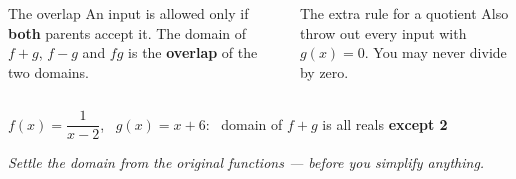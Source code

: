 \documentclass[aspectratio=169, 11pt]{beamer}
\begin{document}
\begin{frame}[t, plain]

  \begin{columns}[T]
      \begin{block}{The overlap}
        An input is allowed only if \textbf{both} parents accept it. The domain
        of \(f+g\), \(f-g\) and \(fg\) is the \textbf{overlap} of the two
        domains.
      \end{block}

      \begin{block}{The extra rule for a quotient}
        Also throw out every input with \(g(x) = 0\). You may never divide by
        zero.
      \end{block}
  \end{columns}

  \bigskip
  \begin{center}
    {\large \(f(x) = \dfrac{1}{x-2}\), \ \(g(x) = x + 6\): \ domain of \(f+g\) is
    all reals \textbf{except 2}}
  \end{center}

  \bigskip
  \textit{Settle the domain from the original functions --- before you simplify
  anything.}
\end{frame}
\end{document}
